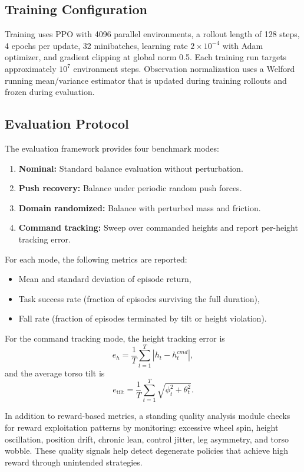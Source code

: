 \documentclass[conference]{IEEEtran}
\begin{document}
\subsection{Training Configuration}
Training uses PPO with 4096 parallel environments, a rollout length of 128 steps, 4 epochs per update, 32 minibatches, learning rate $2 \times 10^{-4}$ with Adam optimizer, and gradient clipping at global norm 0.5. Each training run targets approximately $10^7$ environment steps. Observation normalization uses a Welford running mean/variance estimator that is updated during training rollouts and frozen during evaluation.

\subsection{Evaluation Protocol}
The evaluation framework provides four benchmark modes:
\begin{enumerate}
    \item \textbf{Nominal:} Standard balance evaluation without perturbation.
    \item \textbf{Push recovery:} Balance under periodic random push forces.
    \item \textbf{Domain randomized:} Balance with perturbed mass and friction.
    \item \textbf{Command tracking:} Sweep over commanded heights and report per-height tracking error.
\end{enumerate}

For each mode, the following metrics are reported:
\begin{itemize}
    \item Mean and standard deviation of episode return,
    \item Task success rate (fraction of episodes surviving the full duration),
    \item Fall rate (fraction of episodes terminated by tilt or height violation).
\end{itemize}

For the command tracking mode, the height tracking error is
\begin{equation}
e_h = \frac{1}{T}\sum_{t=1}^{T} |h_t - h_t^{cmd}|,
\end{equation}
and the average torso tilt is
\begin{equation}
e_{\mathrm{tilt}} =
\frac{1}{T}\sum_{t=1}^{T}\sqrt{\phi_t^2+\theta_t^2}.
\end{equation}

In addition to reward-based metrics, a standing quality analysis module checks for reward exploitation patterns by monitoring: excessive wheel spin, height oscillation, position drift, chronic lean, control jitter, leg asymmetry, and torso wobble. These quality signals help detect degenerate policies that achieve high reward through unintended strategies.
\end{document}
